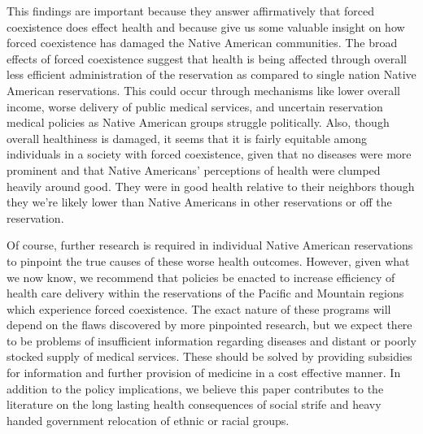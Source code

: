 \documentclass[12pt]{article}
\begin{document}
This findings are important because they answer affirmatively that forced coexistence does effect health and because give us some valuable insight on how forced coexistence has damaged the Native American communities. The broad effects of forced coexistence suggest that health is being affected through overall less efficient administration of the reservation as compared to single nation Native American reservations.  This could occur through mechanisms like lower overall income, worse delivery of public medical services, and uncertain reservation medical policies as Native American groups struggle politically. Also, though overall healthiness is damaged, it seems that it is fairly equitable among individuals in a society with forced coexistence, given that no diseases were more prominent and that Native Americans’ perceptions of health were clumped heavily around good.  They were in good health relative to their neighbors though they we’re likely lower than Native Americans in other reservations or off the reservation.  

Of course, further research is required in individual Native American reservations to pinpoint the true causes of these worse health outcomes.  However, given what we now know, we recommend that policies be enacted to increase efficiency of health care delivery within the reservations of the Pacific and Mountain regions which experience forced coexistence.  The exact nature of these programs will depend on the flaws discovered by more pinpointed research, but we expect there to be problems of insufficient information regarding diseases and distant or poorly stocked supply of medical services.  These should be solved by providing subsidies for information and further provision of medicine in a cost effective manner.  In addition to the policy implications, we believe this paper contributes to the literature on the long lasting health consequences of social strife and heavy handed government relocation of ethnic or racial groups.


\newpage


\end{document}
